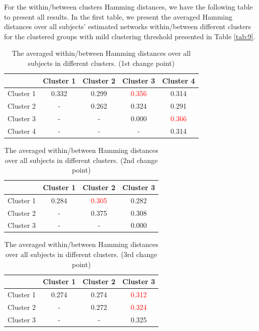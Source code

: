 \documentclass[11pt]{article}
\begin{document}
For the within/between clusters Hamming distances, we have the following table to present all results. In the first table, we present the averaged Hamming distances over all subjects' estimated networks within/between different clusters for the clustered groups with mild clustering threshold presented in Table \ref{tab:9}. 
\begin{table}[!ht]
    \centering
    \caption{The averaged within/between Hamming distances over all subjects in different clusters. (1st change point)}
    \label{tab:wb-dist-cp1}
    \begin{tabular}{c|c|c|c|c}
    \hline\hline
         & Cluster 1 & Cluster 2 & Cluster 3 & Cluster 4 \\
    \hline
         Cluster 1 & 0.332 & 0.299 & \textcolor{red}{0.356} & 0.314 \\
         Cluster 2 & - & 0.262 & 0.324 & 0.291 \\
         Cluster 3 & - & - & 0.000 & \textcolor{red}{0.366} \\
         Cluster 4 & - & - & - & 0.314 \\
    \hline\hline
    \end{tabular}
\end{table}

\begin{table}[!ht]
    \centering
    \caption{The averaged within/between Hamming distances over all subjects in different clusters. (2nd change point)}
    \label{tab:wb-dist-cp2}
    \begin{tabular}{c|c|c|c}
    \hline\hline
         & Cluster 1 & Cluster 2 & Cluster 3 \\
    \hline
         Cluster 1 & 0.284 & \textcolor{red}{0.305} & 0.282 \\
         Cluster 2 & - & 0.375 & 0.308 \\
         Cluster 3 & - & - & 0.000 \\
    \hline\hline
    \end{tabular}
\end{table}

\begin{table}[!ht]
    \centering
    \caption{The averaged within/between Hamming distances over all subjects in different clusters. (3rd change point)}
    \label{tab:wb-dist-cp3}
    \begin{tabular}{c|c|c|c}
    \hline\hline
         & Cluster 1 & Cluster 2 & Cluster 3 \\
    \hline
         Cluster 1 & 0.274 & 0.274 & \textcolor{red}{0.312} \\
         Cluster 2 & - & 0.272 & \textcolor{red}{0.324} \\
         Cluster 3 & - & - & 0.325 \\
    \hline\hline
    \end{tabular}
\end{table}
\end{document}
